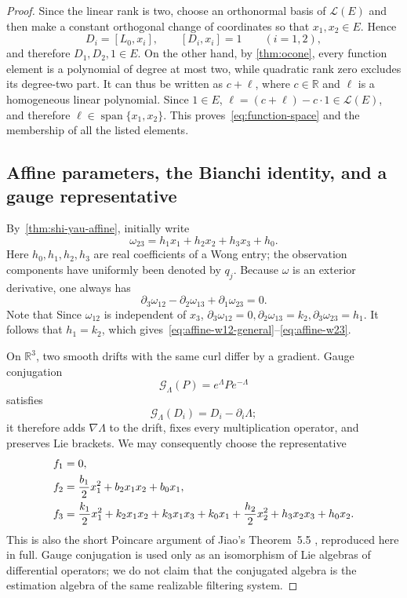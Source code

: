 \documentclass[11pt,a4paper]{article}
\numberwithin{equation}{section}
\theoremstyle{journalplain}
\theoremstyle{journaldef}
\DeclareMathOperator{\Span}{span}
\newcommand{\R}{\mathbb R}
\newcommand{\pd}{\partial}
\begin{document}
\begin{proof}
Since the linear rank is two, choose an orthonormal basis of
$\mathscr L(E)$ and then make a constant orthogonal change of coordinates so
that $x_1,x_2\in E$.  Hence
\[
D_i=[L_0,x_i],\qquad [D_i,x_i]=1\qquad(i=1,2),
\]
and therefore $D_1,D_2,1\in E$.  On the other hand, by
\cref{thm:ocone}, every function element is a polynomial of degree at most
two, while quadratic rank zero excludes its degree-two part.  It can thus be
written as $c+\ell$, where $c\in\R$ and $\ell$ is a homogeneous linear
polynomial.  Since $1\in E$,
$\ell=(c+\ell)-c\cdot1\in\mathscr L(E)$, and therefore
$\ell\in\Span\{x_1,x_2\}$.  This proves~\eqref{eq:function-space} and the
membership of all the listed elements.


\subsection{Affine parameters, the Bianchi identity, and a gauge representative}

By~\cref{thm:shi-yau-affine}, initially write
\[
\omega_{23}=h_1x_1+h_2x_2+h_3x_3+h_0.
\]
Here $h_0,h_1,h_2,h_3$ are real coefficients of a Wong entry; the observation
components have uniformly been denoted by $q_j$.
Because $\omega$ is an exterior derivative, one always has
\begin{equation}
\pd_3\omega_{12}-\pd_2\omega_{13}+\pd_1\omega_{23}=0.
\label{eq:Bianchi}
\end{equation}
Note that  Since $\omega_{12}$ is independent of $x_3$, $\partial_3 \omega_{12} = 0, \partial_2\omega_{13} = k_2, \partial_3 \omega_{23} = h_1$. It follows that $h_1=k_2$,
which gives~\eqref{eq:affine-w12-general}--\eqref{eq:affine-w23}.

On $\R^3$, two smooth drifts with the same curl differ by a gradient.  Gauge
conjugation
\[
\mathcal G_\Lambda(P)=e^\Lambda Pe^{-\Lambda}
\]
satisfies
\[
\mathcal G_\Lambda(D_i)=D_i-\pd_i\Lambda;
\]
it therefore adds $\nabla\Lambda$ to the drift, fixes every multiplication
operator, and preserves Lie brackets.  We may consequently choose the
representative
\begin{align}
f_1&=0,\notag\\
f_2&=\frac{b_1}{2}x_1^2+b_2x_1x_2+b_0x_1,\label{eq:f2-general}\\
f_3&=\frac{k_1}{2}x_1^2+k_2x_1x_2+k_3x_1x_3+k_0x_1
 +\frac{h_2}{2}x_2^2+h_3x_2x_3+h_0x_2.
\label{eq:f3-general}
\end{align}
This is also the short Poincare argument of Jiao's Theorem~5.5
\cite[pp.~83--85]{Jiao2022}, reproduced here in full.  Gauge conjugation is
used only as an isomorphism of Lie algebras of differential operators; we do
not claim that the conjugated algebra is the estimation algebra of the same
realizable filtering system.

\end{proof}
\end{document}
